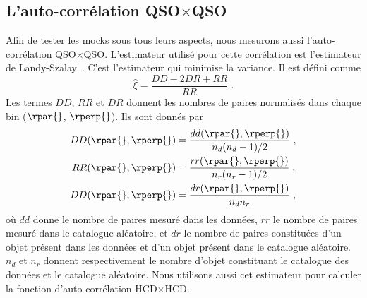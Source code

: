  \subsection{L'auto-corrélation QSO$\times$QSO}
  \label{subsec:co_estimateur}
Afin de tester les mocks sous tous leurs aspects, nous mesurons aussi l'auto-corrélation QSO$\times$QSO. L'estimateur utilisé pour cette corrélation est l'estimateur de Landy-Szalay~\autocite{Landy1993}. C'est l'estimateur qui minimise la variance. Il est défini comme
\begin{equation}
  \label{eq:estimateur_co}
  \hat \xi = \frac{DD - 2DR + RR}{RR} \; .
\end{equation}
Les termes $DD$, $RR$ et $DR$ donnent les nombres de paires normalisés dans chaque bin ($\rpar{}$, $\rperp{}$). Ils sont donnés par
\begin{align}
  DD(\rpar{}, \rperp{}) &= \frac{dd(\rpar{}, \rperp{})}{n_d(n_d-1)/2} \; ,\\
  RR(\rpar{}, \rperp{}) &= \frac{rr(\rpar{}, \rperp{})}{n_r(n_r-1)/2} \; ,\\
  DD(\rpar{}, \rperp{}) &= \frac{dr(\rpar{}, \rperp{})}{n_dn_r}  \; ,
\end{align}
où $dd$ donne le nombre de paires mesuré dans les données, $rr$ le nombre de paires mesuré dans le catalogue aléatoire, et $dr$ le nombre de paires constituées d'un objet présent dans les données et d'un objet présent dans le catalogue aléatoire. $n_d$ et $n_r$ donnent respectivement le nombre d'objet constituant le catalogue des données et le catalogue aléatoire.
Nous utilisons aussi cet estimateur pour calculer la fonction d'auto-corrélation HCD$\times$HCD.



